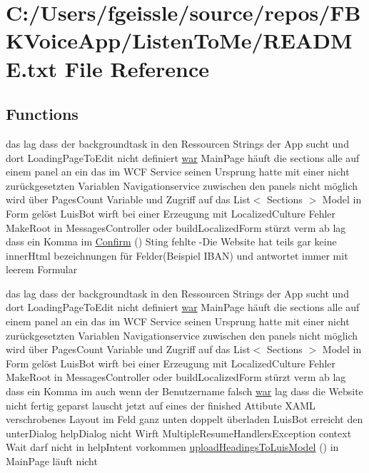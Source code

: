 \hypertarget{_r_e_a_d_m_e_8txt}{}\section{C\+:/\+Users/fgeissle/source/repos/\+F\+B\+K\+Voice\+App/\+Listen\+To\+Me/\+R\+E\+A\+D\+ME.txt File Reference}
\label{_r_e_a_d_m_e_8txt}
\subsection*{Functions}
\begin{DoxyCompactItemize}
\item 
das lag dass der backgroundtask in den Ressourcen Strings der App sucht und dort Loading\+Page\+To\+Edit nicht definiert \mbox{\hyperlink{_r_e_a_d_m_e_8txt_a2a72fc7da943588cba8c302409b22e53}{war}} Main\+Page häuft die sections alle auf einem panel an ein das im W\+CF Service seinen Ursprung hatte mit einer nicht zurückgesetzten Variablen Navigationservice zuwischen den panels nicht möglich wird über Pages\+Count Variable und Zugriff auf das List$<$ Sections $>$ Model in Form gelöst Luis\+Bot wirft bei einer Erzeugung mit Localized\+Culture Fehler Make\+Root in Messages\+Controller oder build\+Localized\+Form stürzt verm ab lag dass ein Komma im \mbox{\hyperlink{_r_e_a_d_m_e_8txt_a3f0b43af3dec73858a3eea661590145f}{Confirm}} () Sting fehlte -\/Die Website hat teils gar keine inner\+Html bezeichnungen für Felder(Beispiel I\+B\+AN) und antwortet immer mit leerem Formular
\item 
das lag dass der backgroundtask in den Ressourcen Strings der App sucht und dort Loading\+Page\+To\+Edit nicht definiert \mbox{\hyperlink{_r_e_a_d_m_e_8txt_a2a72fc7da943588cba8c302409b22e53}{war}} Main\+Page häuft die sections alle auf einem panel an ein das im W\+CF Service seinen Ursprung hatte mit einer nicht zurückgesetzten Variablen Navigationservice zuwischen den panels nicht möglich wird über Pages\+Count Variable und Zugriff auf das List$<$ Sections $>$ Model in Form gelöst Luis\+Bot wirft bei einer Erzeugung mit Localized\+Culture Fehler Make\+Root in Messages\+Controller oder build\+Localized\+Form stürzt verm ab lag dass ein Komma im auch wenn der Benutzername falsch \mbox{\hyperlink{_r_e_a_d_m_e_8txt_a2a72fc7da943588cba8c302409b22e53}{war}} lag dass die Website nicht fertig geparst lauscht jetzt auf eines der finished Attibute X\+A\+ML verschrobenes Layout im Feld ganz unten doppelt überladen Luis\+Bot erreicht den unter\+Dialog help\+Dialog nicht Wirft Multiple\+Resume\+Handlers\+Exception context Wait darf nicht in help\+Intent vorkommen \mbox{\hyperlink{_r_e_a_d_m_e_8txt_a2aaebc81a95fa9e9802135da338a8e3e}{upload\+Headings\+To\+Luis\+Model}} () in Main\+Page läuft nicht
\end{DoxyCompactItemize}
